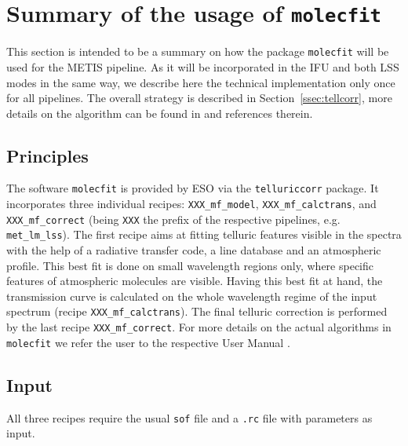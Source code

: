 \section{Summary of the usage of \texttt{molecfit}}\label{app:mf}
This section is intended to be a summary on how the package \texttt{molecfit} will be used for the \ac{METIS} pipeline. As it will be incorporated in the \ac{IFU} and both \ac{LSS} modes in the same way, we describe here the technical implementation only once for all pipelines. The overall strategy is described in Section~\ref{ssec:tellcorr}, more details on the \mf algorithm can be found in \cite{molecfit} and references therein.

\subsection{Principles}\label{app:mf_principles}
The software \texttt{molecfit} is provided by \ac{ESO} via the \texttt{telluriccorr} package. It incorporates three individual recipes: \texttt{XXX\_mf\_model}, \texttt{XXX\_mf\_calctrans}, and \texttt{XXX\_mf\_correct} (being \texttt{XXX} the prefix of the respective pipelines, e.g. \texttt{met\_lm\_lss}). The first recipe aims at fitting telluric features visible in the spectra with the help of a radiative transfer code, a line database and an atmospheric profile. This best fit is done on small wavelength regions only, where specific features of atmospheric molecules are visible. Having this best fit at hand, the transmission curve is calculated on the whole wavelength regime of the input spectrum (recipe \texttt{XXX\_mf\_calctrans}). The final telluric correction is performed by the last recipe \texttt{XXX\_mf\_correct}. For more details on the actual algorithms in \texttt{molecfit} we refer the user to the respective User Manual \cite{molecfit}.\\

\subsection{Input}\label{app:mf_input}
All three recipes require the usual \texttt{sof} file and a \texttt{.rc} file with parameters as input.
